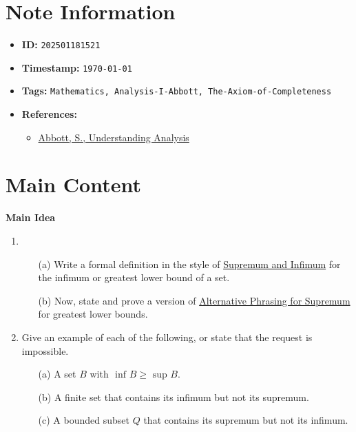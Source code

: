 \clearpage
{}
\label{202501181521}
\renewcommand{\notetitle}{Additional Review}

\section*{Note Information}
\begin{itemize}
  \item \textbf{ID:} \texttt{202501181521}
  \item \textbf{Timestamp:} \texttt{\today \ \currenttime}
  \item \textbf{Tags:} \texttt{Mathematics, Analysis-I-Abbott, The-Axiom-of-Completeness}
  \item \textbf{References:}
    \begin{itemize}
      \item \href{/home/garrett/Personal/References/Mathematics/Analysis-I/Abbott.pdf}{Abbott, S., Understanding Analysis}
    \end{itemize}
\end{itemize}


\section*{Main Content}
\textbf{Main Idea}\\
\begin{enumerate}
  \item 
    \begin{enumerate}
      \item[(a)] Write a formal definition in the style of \hyperref[202501180743]{Supremum and Infimum} for the infimum or greatest lower bound of a set.
      \item[(b)] Now, state and prove a version of \hyperref[202501181335]{Alternative Phrasing for Supremum} for greatest lower bounds.
    \end{enumerate}
  \item Give an example of each of the following, or state that the request is impossible.
    \begin{enumerate}
      \item[(a)] A set $B$ with $\text{ inf } B \geq \text{ sup } B$.
      \item[(b)] A finite set that contains its infimum but not its supremum.
      \item[(c)] A bounded subset $Q$ that contains its supremum but not its infimum.
    \end{enumerate}
\end{enumerate}

